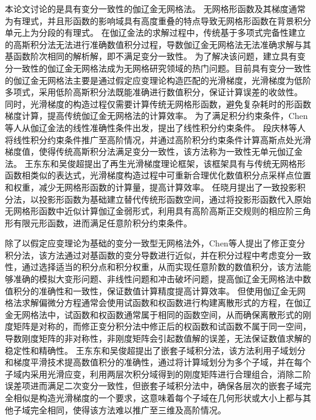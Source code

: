 本论文讨论的是具有变分一致性的伽辽金无网格法\cite{babuska2008,wu2021}。
无网格形函数及其梯度通常为有理式，并且形函数的影响域具有高度重叠的特点导致无网格形函数在背景积分单元上为分段的有理式。
在伽辽金法的求解过程中，传统基于多项式完备性建立的高斯积分法无法进行准确数值积分过程，导数伽辽金无网格法无法准确求解与其基函数阶次相同的解析解，即不满足变分一致性\cite{1999Numerical}。
为了解决该问题，建立具有变分一致性的伽辽金无网格法成为无网格研究领域的热门问题。目前具有变分一致性的伽辽金无网格法主要是通过假定应变理论构造匹配的光滑梯度，光滑梯度为低阶多项式，采用低阶高斯积分法既能准确进行数值积分，保证计算误差的收敛性。
同时，光滑梯度的构造过程仅需要计算传统无网格形函数，避免复杂耗时的形函数梯度计算，提高传统伽辽金无网格法的计算效率。
为了满足积分约束条件，Chen等人从伽辽金法的线性准确性条件出发，提出了线性积分约束条件\cite{chen2001}。
段庆林等人\cite{陈嵩涛2020几何非线性分析的高效高阶无网格法,duan2012}将线性积分约束条件推广至高阶情况，并通过高阶积分约束条件计算高斯点处光滑梯度值，使得传统高斯积分法满足变分一致性，该方法称为一致性无单元伽辽金法。
王东东和吴俊超提出了再生光滑梯度理论框架\cite{wang2019}，该框架具有与传统无网格形函数相类似的表达式，光滑梯度构造过程中可重新合理优化数值积分点采样点位置和权重，减少无网格形函数的计算量，提高计算效率。
任晓月\cite{wang2023}提出了一致投影积分法，以投影形函数为基础建立替代传统形函数空间，通过将投影形函数代入原始无网格形函数中近似计算伽辽金弱形式，利用具有高阶高斯正交规则的相应阶三角形有限元形函数，进而满足任意阶积分约束条件。

除了以假定应变理论为基础的变分一致型无网格法外，Chen等人\cite{chen1996}提出了修正变分积分法，该方法通过对基函数的变分导数进行近似，并在积分过程中考虑变分一致性，通过选择适当的积分点和积分权重，从而实现任意阶数的数值积分，该方法能够准确的模拟大变形问题、非线性问题和冲击破坏问题，提高伽辽金无网格法中数值积分的准确性和一致性，保证数值计算精度提高计算效率。
但使用伽辽金无网格法求解偏微分方程通常会使用试函数和权函数进行构建离散形式的方程，在伽辽金无网格法中，试函数和权函数通常属于相同的函数空间，从而确保离散形式的刚度矩阵是对称的，而修正变分积分法中修正后的权函数和试函数不属于同一空间，导数刚度矩阵的非对称性，非刚度矩阵会引起数值解的误差，无法保证数值求解的稳定性和精确性。
王东东和吴俊超提出了嵌套子域积分法\cite{wang2016}，该方法利用子域划分和梯度平滑技术提高数值积分的准确性，通过将计算域划分为多个子域，并在每个子域内采用光滑应变，利用两层次积分域得到的刚度矩阵进行合理组合，消除二阶误差项进而满足二次变分一致性，但嵌套子域积分法中，确保各层次的嵌套子域完全相似是构造光滑梯度的一个要求，这意味着每个子域在几何形状或大小上都与其他子域完全相同，使得该方法难以推广至三维及高阶情况。


